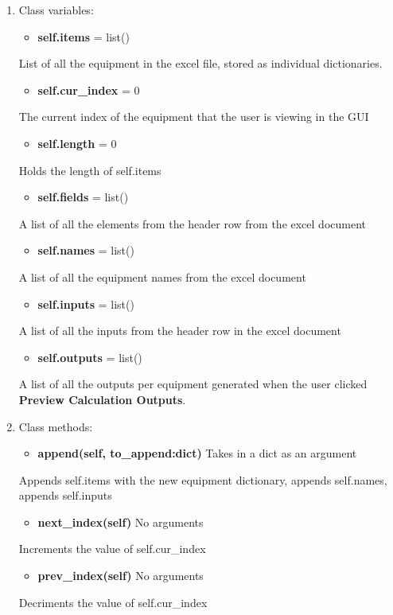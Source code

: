 \documentclass[11pt]{article}
\begin{document}
\begin{enumerate}
\item Class variables:
\label{sec:org8ab64b3}
\begin{itemize}
\item \textbf{self.items} = list()
\end{itemize}
List of all the equipment in the excel file, stored as individual dictionaries.

\begin{itemize}
\item \textbf{self.cur\_index} = 0
\end{itemize}
The current index of the equipment that the user is viewing in the GUI

\begin{itemize}
\item \textbf{self.length} = 0
\end{itemize}
Holds the length of self.items

\begin{itemize}
\item \textbf{self.fields} = list()
\end{itemize}
A list of all the elements from the header row from the excel document

\begin{itemize}
\item \textbf{self.names} = list()
\end{itemize}
A list of all the equipment names from the excel document

\begin{itemize}
\item \textbf{self.inputs} = list()
\end{itemize}
A list of all the inputs from the header row in the excel document

\begin{itemize}
\item \textbf{self.outputs} = list()
\end{itemize}
A list of all the outputs per equipment generated when the user clicked \textbf{Preview Calculation Outputs}. 

\item Class methods:
\label{sec:orgacc1bf7}

\begin{itemize}
\item \textbf{append(self, to\_append:dict)} Takes in a dict as an argument
\end{itemize}
Appends self.items with the new equipment dictionary, appends self.names, appends self.inputs

\begin{itemize}
\item \textbf{next\_index(self)} No arguments
\end{itemize}
Increments the value of self.cur\_index

\begin{itemize}
\item \textbf{prev\_index(self)} No arguments
\end{itemize}
Decriments the value of self.cur\_index
\end{enumerate}
\end{document}
